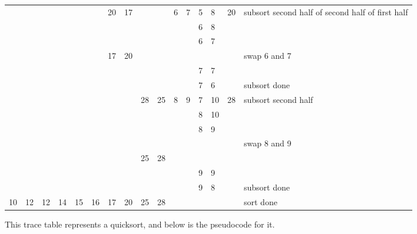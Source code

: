 \documentclass[
]{article}
\begin{document}
\begin{longtable}[]{@{}llllllllllllllll@{}}
& & & & & & 20 & 17 & & & 6 & 7 & 5 & 8 & 20 & subsort second half of
second half of first half \\
& & & & & & & & & & & & 6 & 8 & & \\
& & & & & & & & & & & & 6 & 7 & & \\
& & & & & & 17 & 20 & & & & & & & & swap 6 and 7 \\
& & & & & & & & & & & & 7 & 7 & & \\
& & & & & & & & & & & & 7 & 6 & & subsort done \\
& & & & & & & & 28 & 25 & 8 & 9 & 7 & 10 & 28 & subsort second half \\
& & & & & & & & & & & & 8 & 10 & & \\
& & & & & & & & & & & & 8 & 9 & & \\
& & & & & & & & & & & & & & & swap 8 and 9 \\
& & & & & & & & 25 & 28 & & & & & & \\
& & & & & & & & & & & & 9 & 9 & & \\
& & & & & & & & & & & & 9 & 8 & & subsort done \\
10 & 12 & 12 & 14 & 15 & 16 & 17 & 20 & 25 & 28 & & & & & & sort done \\
\end{longtable}

This trace table represents a quicksort, and below is the pseudocode for
it.
\end{document}
